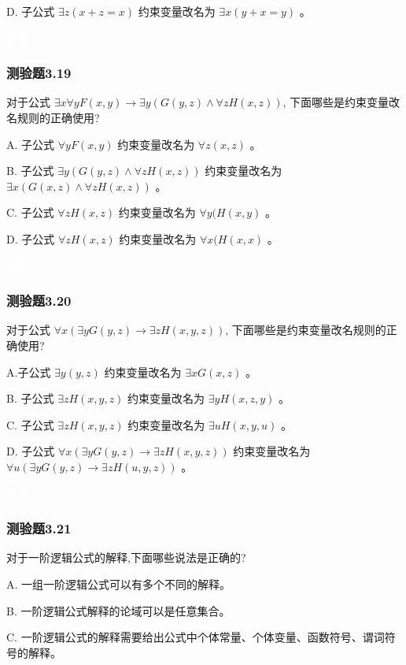 \documentclass[UTF8, heading=true]{ctexart}
\begin{document}
D.  
子公式 $\exists z(x+z=x)$ 约束变量改名为 $\exists x(y+x=y)$ 。

\textcolor{white}{答案：C}

\subsubsection{测验题3.19}

对于公式 $\exists x \forall y F(x, y) \rightarrow \exists y(G(y, z) \wedge \forall z H(x, z))$, 下面哪些是约束变量改名规则的正确使用?

A. 子公式 $\forall y F(x, y)$ 约束变量改名为 $\forall z(x, z)$ 。

B. 子公式 $\exists y(G(y, z) \wedge \forall z H(x, z))$ 约束变量改名为 $\exists x(G(x, z) \wedge \forall z H(x, z))$ 。

C. 子公式 $\forall z H(x, z)$ 约束变量改名为 $\forall y(H(x, y)$ 。

D. 子公式 $\forall z H(x, z)$ 约束变量改名为 $\forall x(H(x, x)$ 。

\textcolor{white}{答案：A}

\subsubsection{测验题3.20}

对于公式 $\forall x(\exists y G(y, z) \rightarrow \exists z H(x, y, z))$, 下面哪些是约束变量改名规则的正确使用?

A.子公式 $\exists y(y, z)$ 约束变量改名为 $\exists x G(x, z)$ 。

B.
子公式 $\exists z H(x, y, z)$ 约束变量改名为 $\exists y H(x, z, y)$ 。

C.
子公式 $\exists z H(x, y, z)$ 约束变量改名为 $\exists u H(x, y, u)$ 。

D.
子公式 $\forall x(\exists y G(y, z) \rightarrow \exists z H(x, y, z))$ 约束变量改名为 $\forall u(\exists y G(y, z) \rightarrow \exists z H(u, y, z))$ 。

\textcolor{white}{答案：CD}

\subsubsection{测验题3.21}

对于一阶逻辑公式的解释,下面哪些说法是正确的?

A. 一组一阶逻辑公式可以有多个不同的解释。

B.  一阶逻辑公式解释的论域可以是任意集合。

C.   一阶逻辑公式的解释需要给出公式中个体常量、个体变量、函数符号、谓词符号的解释。
\end{document}
